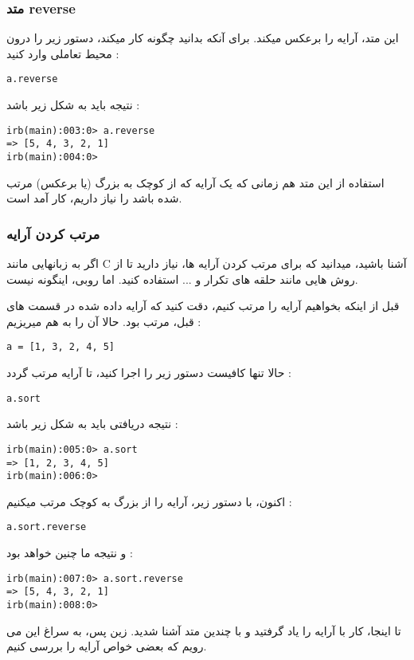 \documentclass[11pt]{article}
\begin{document}
\subsubsection{متد reverse}
این متد، آرایه را برعکس میکند. برای آنکه بدانید چگونه کار میکند، دستور زیر را درون محیط تعاملی وارد کنید :
\begin{latin}
\begin{verbatim}
a.reverse
\end{verbatim}
\end{latin}
نتیجه باید به شکل زیر باشد :
\begin{latin}
\begin{verbatim}
irb(main):003:0> a.reverse
=> [5, 4, 3, 2, 1]
irb(main):004:0> 
\end{verbatim}
\end{latin}
استفاده از این متد هم زمانی که یک آرایه که از کوچک به بزرگ (یا برعکس) مرتب شده باشد را نیاز داریم، کار آمد است. 
\subsubsection{مرتب کردن آرایه}
اگر به زبانهایی مانند C آشنا باشید، میدانید که برای مرتب کردن آرایه ها، نیاز دارید تا از روش هایی مانند حلقه های تکرار و ... استفاده کنید. اما روبی، اینگونه نیست. 

قبل از اینکه بخواهیم آرایه را مرتب کنیم، دقت کنید که آرایه داده شده در قسمت های قبل، مرتب بود. حالا آن را به هم میریزیم :
\begin{latin}
\begin{verbatim}
a = [1, 3, 2, 4, 5]
\end{verbatim}
\end{latin}
حالا تنها کافیست دستور زیر را اجرا کنید، تا آرایه مرتب گردد :
\begin{latin}
\begin{verbatim}
a.sort
\end{verbatim}
\end{latin}
نتیجه دریافتی باید به شکل زیر باشد :
\begin{latin}
\begin{verbatim}
irb(main):005:0> a.sort
=> [1, 2, 3, 4, 5]
irb(main):006:0> 
\end{verbatim}
\end{latin}
اکنون، با دستور زیر، آرایه را از بزرگ به کوچک مرتب میکنیم :
\begin{latin}
\begin{verbatim}
a.sort.reverse
\end{verbatim}
\end{latin}
و نتیجه ما چنین خواهد بود :
\begin{latin}
\begin{verbatim}
irb(main):007:0> a.sort.reverse
=> [5, 4, 3, 2, 1]
irb(main):008:0> 
\end{verbatim}
\end{latin}
تا اینجا، کار با آرایه را یاد گرفتید و با چندین متد آشنا شدید. زین پس، به سراغ این می رویم که بعضی خواص آرایه را بررسی کنیم. 
\end{document}
